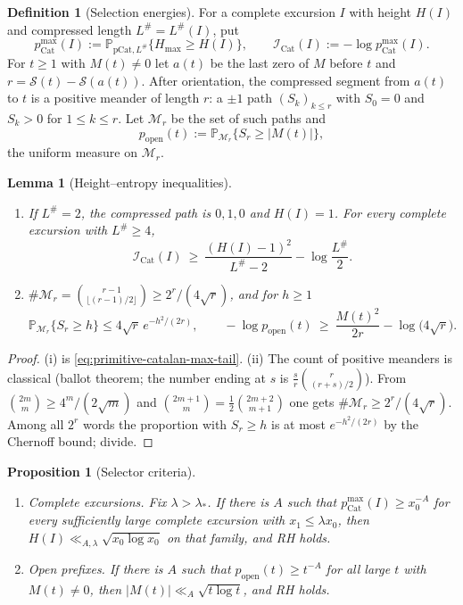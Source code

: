 \documentclass[11pt]{amsart}
\numberwithin{equation}{section}
\theoremstyle{plain}
\newtheorem{proposition}[theorem]{Proposition}
\newtheorem{lemma}[theorem]{Lemma}
\theoremstyle{definition}
\newtheorem{definition}[theorem]{Definition}
\theoremstyle{remark}
\newcommand{\Sq}{\mathcal{S}}
\begin{document}
\begin{definition}[Selection energies]
\label{def:selection-energies}
For a complete excursion $I$ with height $H(I)$ and compressed length
$L^\#=L^\#(I)$, put
\[
p^{\max}_{\mathrm{Cat}}(I):=\mathbb P_{\mathrm{pCat},L^\#}\{H_{\max}\ge H(I)\},
\qquad
\mathcal I_{\mathrm{Cat}}(I):=-\log p^{\max}_{\mathrm{Cat}}(I).
\]
For $t\ge1$ with $M(t)\ne0$ let $a(t)$ be the last zero of $M$ before $t$ and
$r=\Sq(t)-\Sq(a(t))$. After orientation, the compressed segment from $a(t)$ to
$t$ is a positive meander of length $r$: a $\pm1$ path $(S_k)_{k\le r}$ with
$S_0=0$ and $S_k>0$ for $1\le k\le r$. Let $\mathcal M_r$ be the set of such
paths and
\[
p_{\mathrm{open}}(t):=\mathbb P_{\mathcal M_r}\{S_r\ge|M(t)|\},
\]
the uniform measure on $\mathcal M_r$.
\end{definition}

\begin{lemma}[Height--entropy inequalities]
\label{lem:height-entropy}
\begin{enumerate}[label=\textup{(\roman*)}]
\item If $L^\#=2$, the compressed path is $0,1,0$ and $H(I)=1$. For every
complete excursion with $L^\#\ge4$,
\[
\mathcal I_{\mathrm{Cat}}(I)\ \ge\ \frac{(H(I)-1)^2}{L^\#-2}-\log\frac{L^\#}2 .
\]
\item $\#\mathcal M_r=\binom{r-1}{\lfloor(r-1)/2\rfloor}\ge2^r/(4\sqrt r)$,
and for $h\ge1$
\[
\mathbb P_{\mathcal M_r}\{S_r\ge h\}\le4\sqrt r\,e^{-h^2/(2r)},
\qquad
-\log p_{\mathrm{open}}(t)\ \ge\ \frac{M(t)^2}{2r}-\log\bigl(4\sqrt r\bigr).
\]
\end{enumerate}
\end{lemma}

\begin{proof}
(i) is \eqref{eq:primitive-catalan-max-tail}. (ii) The count of positive
meanders is classical (ballot theorem; the number ending at $s$ is
$\frac sr\binom{r}{(r+s)/2}$). From
$\binom{2m}{m}\ge4^m/(2\sqrt m)$ and
$\binom{2m+1}{m}=\frac12\binom{2m+2}{m+1}$ one gets
$\#\mathcal M_r\ge2^r/(4\sqrt r)$. Among all $2^r$ words the proportion with
$S_r\ge h$ is at most $e^{-h^2/(2r)}$ by the Chernoff bound; divide.
\end{proof}

\begin{proposition}[Selector criteria]
\label{prop:selector-criteria}
\begin{enumerate}[label=\textup{(\roman*)}]
\item \emph{Complete excursions.} Fix $\lambda>\lambda_*$. If there is $A$
such that $p^{\max}_{\mathrm{Cat}}(I)\ge x_0^{-A}$ for every sufficiently
large complete excursion with $x_1\le\lambda x_0$, then
$H(I)\ll_{A,\lambda}\sqrt{x_0\log x_0}$ on that family, and RH holds.
\item \emph{Open prefixes.} If there is $A$ such that
$p_{\mathrm{open}}(t)\ge t^{-A}$ for all large $t$ with $M(t)\ne0$, then
$|M(t)|\ll_A\sqrt{t\log t}$, and RH holds.
\end{enumerate}
\end{proposition}
\end{document}
